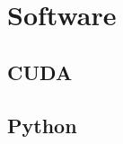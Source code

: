 \section{Software}\label{soft}
\subsection{CUDA}\label{soft:sec:cuda}
\subsection{Python}\label{soft:sec:py}
